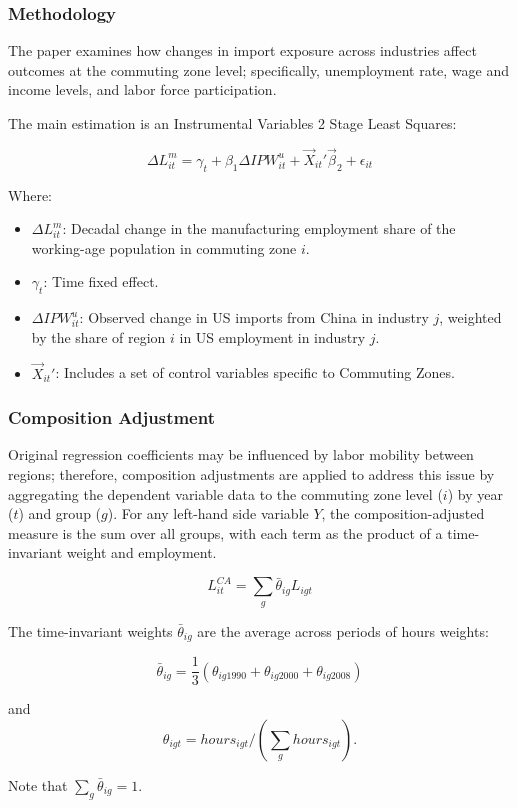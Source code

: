 \begin{frame}
    \frametitle{Methodology}
    The paper examines how changes in import exposure across industries affect outcomes at the commuting
zone level; specifically, unemployment rate, wage and income levels, and labor force participation.

    The main estimation is an Instrumental Variables 2 Stage Least Squares:

    \begin{equation}
        \Delta L_{it}^{m} = \gamma_t + \beta_1 \Delta IPW_{it}^u + \Vec{X}_{it}'\Vec{\beta}_2 + \epsilon_{it}
        \label{eq:main_panel_regression}
    \end{equation}

    Where:

    \begin{itemize}
        \item $\Delta L_{it}^{m}$: Decadal change in the manufacturing employment share of the working-age population in commuting zone $i$.
        \item $\gamma_t$: Time fixed effect.
        \item $\Delta IPW_{it}^u$: Observed change in US imports from China in industry $j$, weighted by the share of region $i$ in US employment in industry $j$.
        \item $\Vec{X}_{it}'$: Includes a set of control variables specific to Commuting Zones.
    \end{itemize}
\end{frame}
\begin{frame}
    \frametitle{Composition Adjustment}
    Original regression coefficients may be influenced by labor mobility between regions; therefore, composition adjustments are applied to address this issue by aggregating the dependent variable data to the commuting zone level ($i$) by year ($t$) and group ($g$). For any left-hand side variable $Y$, the composition-adjusted measure is the sum over all groups, with each term as the product of a time-invariant weight and employment.

    \begin{equation}
        L_{it}^{CA} = \sum_g \bar{\theta}_{ig} L_{igt}
        \label{eq:composition_adjustment}
    \end{equation}

    The time-invariant weights $\bar{\theta}_{ig}$ are the average across periods of hours weights:

    \begin{equation}
        \bar{\theta}_{ig} = \frac{1}{3} \left( \theta_{ig1990}+ \theta_{ig2000}+ \theta_{ig2008}\right)
        \label{eq:time_invariant_weight}
    \end{equation}
    
    and 
    \begin{equation}
        \theta_{igt} = hours_{igt} \Big/ \left( \sum_g hours_{igt} \right).
        \label{eq:weight_per_group}
    \end{equation}

    Note that $\sum_g \bar{\theta}_{ig}=1$.
\end{frame}
